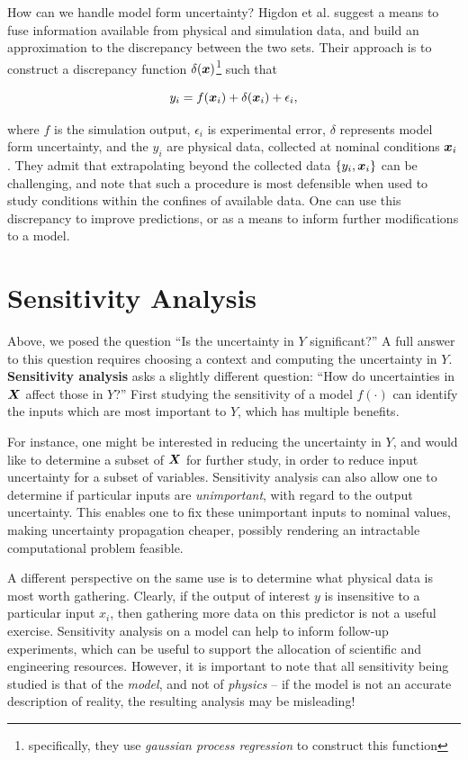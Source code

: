 \documentclass[../primer.tex]{subfiles}
\begin{document}
How can we handle model form uncertainty? Higdon et
al.\cite{higdon2004calibration-prediction} suggest a means to fuse information
available from physical and simulation data, and build an approximation to the
discrepancy between the two sets. Their approach is to construct a discrepancy
function $\delta(\boldsymbol{x})$\footnote{specifically, they use \emph{gaussian process
    regression} to construct this function} such that

\begin{equation}
  y_i = f(\boldsymbol{x}_i) + \delta(\boldsymbol{x}_i) + \epsilon_i,
\end{equation}

\noindent where $f$ is the simulation output, $\epsilon_i$ is experimental
error, $\delta$ represents model form uncertainty, and the $y_i$ are physical
data, collected at nominal conditions $\boldsymbol{x}_i$. They admit that extrapolating
beyond the collected data $\{y_i,\boldsymbol{x}_i\}$ can be challenging, and note that such
a procedure is most defensible when used to study conditions within the confines
of available data. One can use this discrepancy to improve predictions, or as a
means to inform further modifications to a model.\cite{joseph2015engineering}

\section{Sensitivity Analysis} \label{sec:sa}
Above, we posed the question ``Is the uncertainty in $Y$ significant?'' A full
answer to this question requires choosing a context and computing the
uncertainty in $Y$. \textbf{Sensitivity analysis} asks a slightly different
question: ``How do uncertainties in $\boldsymbol{X}$ affect those in $Y$?'' First studying
the sensitivity of a model $f(\cdot)$ can identify the inputs which are most
important to $Y$, which has multiple benefits.

For instance, one might be interested in reducing the uncertainty in $Y$, and
would like to determine a subset of $\boldsymbol{X}$ for further study, in order to reduce
input uncertainty for a subset of variables. Sensitivity analysis can also allow
one to determine if particular inputs are \emph{unimportant}, with regard to the
output uncertainty. This enables one to fix these unimportant inputs to nominal
values, making uncertainty propagation cheaper, possibly rendering an
intractable computational problem feasible.

A different perspective on the same use is to determine what physical data is
most worth gathering. Clearly, if the output of interest $y$ is insensitive to a
particular input $x_i$, then gathering more data on this predictor is not a
useful exercise. Sensitivity analysis on a model can help to inform follow-up
experiments, which can be useful to support the allocation of scientific and
engineering resources. However, it is important to note that all sensitivity
being studied is that of the \emph{model}, and not of \emph{physics} -- if the
model is not an accurate description of reality, the resulting analysis may be
misleading!
\end{document}
